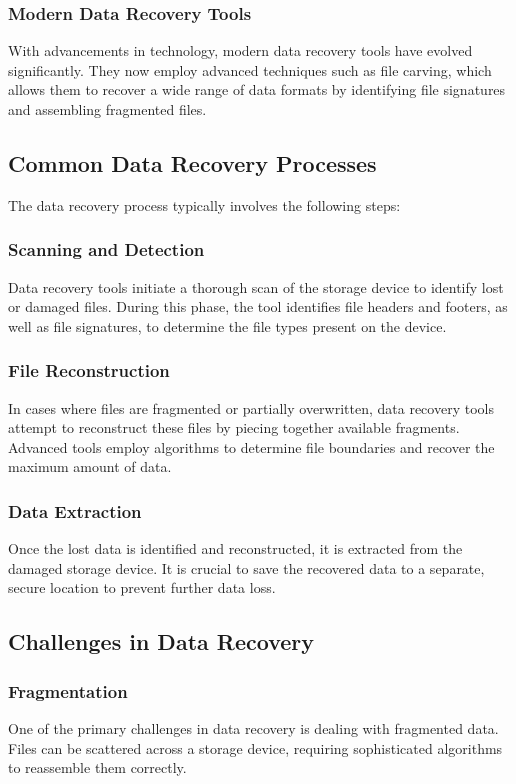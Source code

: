 \documentclass[11pt]{article}
\begin{document}
\subsubsection{Modern Data Recovery Tools}
With advancements in technology, modern data recovery tools have evolved significantly. They now employ advanced techniques such as file carving, which allows them to recover a wide range of data formats by identifying file signatures and assembling fragmented files.

\subsection{Common Data Recovery Processes}
The data recovery process typically involves the following steps:

\subsubsection{Scanning and Detection}
Data recovery tools initiate a thorough scan of the storage device to identify lost or damaged files. During this phase, the tool identifies file headers and footers, as well as file signatures, to determine the file types present on the device.

\subsubsection{File Reconstruction}
In cases where files are fragmented or partially overwritten, data recovery tools attempt to reconstruct these files by piecing together available fragments. Advanced tools employ algorithms to determine file boundaries and recover the maximum amount of data.

\subsubsection{Data Extraction}
Once the lost data is identified and reconstructed, it is extracted from the damaged storage device. It is crucial to save the recovered data to a separate, secure location to prevent further data loss.

\subsection{Challenges in Data Recovery}
\subsubsection{Fragmentation}
One of the primary challenges in data recovery is dealing with fragmented data. Files can be scattered across a storage device, requiring sophisticated algorithms to reassemble them correctly.
\end{document}
